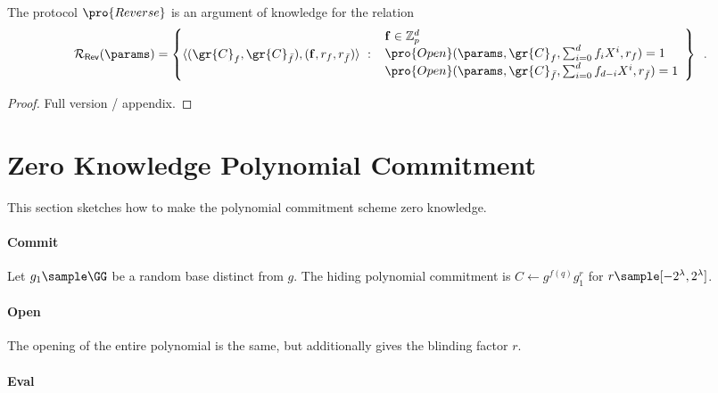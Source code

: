 \begin{lemma}
    The protocol $\pro{Reverse}$ is an argument of knowledge for the relation 
    \[
        \mathcal{R}_\mathsf{Rev}(\params) = \left\{
            \langle ( \gr{C}_f, \gr{C}_{\bar{f}} ), (\mathbf{f}, r_f, r_{\bar{f}})\rangle \ : \ \begin{array}{l}
                \mathbf{f} \in \mathbb{Z}_p^d \\
                \pro{Open}(\params, \gr{C}_f, \sum_{i=0}^d f_i X^i, r_f) = 1 \\
                \pro{Open}(\params, \gr{C}_{\bar{f}}, \sum_{i=0}^d f_{d-i} X^i, r_{\bar{f}}) = 1 
            \end{array}
        \right\} \enspace .
    \]
\end{lemma}

\begin{proof}
Full version / appendix.
\end{proof}


\section{Zero Knowledge Polynomial Commitment} \label{apx:zeroknowledge}

This section sketches how to make the polynomial commitment scheme zero knowledge. 

\paragraph{Commit} Let $g_1 \sample \GG$ be a random base distinct from $g$. 
The hiding polynomial commitment is $C \leftarrow g^{f(q)}g_1^r$ for $r \sample [-2^\lambda, 2^\lambda]$. 

\paragraph{Open} The opening of the entire polynomial is the same, but additionally gives the blinding factor $r$. 

\paragraph{Eval}

